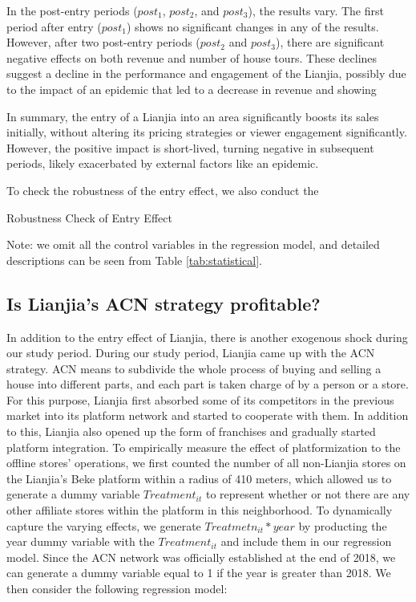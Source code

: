 \documentclass[12pt]{article}
\begin{document}
In the post-entry periods ($post_1$, $post_2$, and $post_3$), the results vary. The first period after entry ($post_1$) shows no significant changes in any of the results. However, after two post-entry periods ($post_2$ and $post_3$), there are significant negative effects on both revenue and number of house tours. These declines suggest a decline in the performance and engagement of the Lianjia, possibly due to the impact of an epidemic that led to a decrease in revenue and showing

In summary, the entry of a Lianjia into an area significantly boosts its sales initially, without altering its pricing strategies or viewer engagement significantly. However, the positive impact is short-lived, turning negative in subsequent periods, likely exacerbated by external factors like an epidemic.

To check the robustness of the entry effect, we also conduct the


\begin{table}
  \begin{center}
    \begin{scriptsize}
      \caption{Robustness Check of Entry Effect}
      \label{tab:entry_effect_robustness}
      
    
    Note: we omit all the control variables in the regression model, and detailed descriptions can be seen from Table \ref{tab:statistical}.
    \end{scriptsize}
  \end{center}
\end{table}

\subsection{Is Lianjia's ACN strategy profitable?} \label{subsec:acn_strategy}

In addition to the entry effect of Lianjia, there is another exogenous shock during our study period. During our study period, Lianjia came up with the ACN strategy. ACN means to subdivide the whole process of buying and selling a house into different parts, and each part is taken charge of by a person or a store. For this purpose, Lianjia first absorbed some of its competitors in the previous market into its platform network and started to cooperate with them. In addition to this, Lianjia also opened up the form of franchises and gradually started platform integration. To empirically measure the effect of platformization to the offline stores' operations, we first counted the number of all non-Lianjia stores on the Lianjia's Beke platform within a radius of 410 meters, which allowed us to generate a dummy variable $Treatment_{it}$ to represent whether or not there are any other affiliate stores within the platform in this neighborhood. To dynamically capture the varying effects, we generate $Treatmetn_{it} * year$ by producting the year dummy variable with the $Treatment_{it}$ and include them in our regression model. Since the ACN network was officially established at the end of 2018, we can generate a dummy variable equal to 1 if the year is greater than 2018. We then consider the following regression model:
\end{document}
